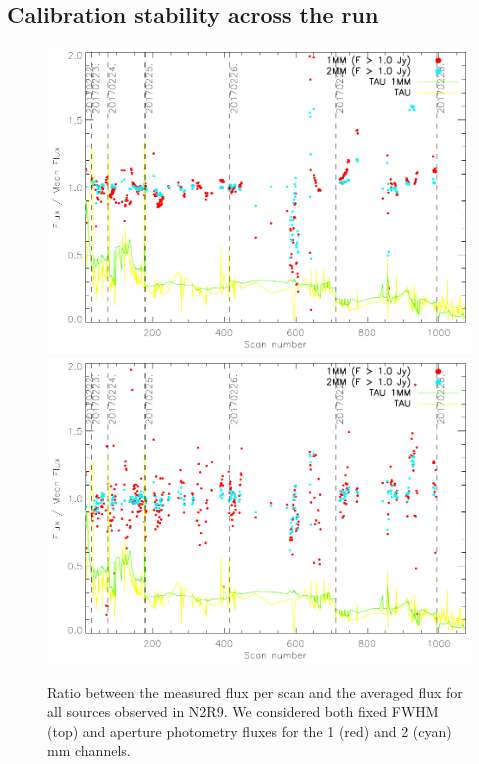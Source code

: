 \subsection{Calibration stability across the run}

\begin{figure}[ht]
\begin{center}
\includegraphics[clip, angle=0, scale = 0.7]{Figures/FluxIndScans/flux_ratio_run22.pdf}
\includegraphics[clip, angle=0, scale = 0.7]{Figures/FluxIndScans/flux_ap_ratio_run22.pdf}
\caption{Ratio between the measured flux per scan and the averaged flux for all sources observed in N2R9. We considered both fixed FWHM (top) and aperture photometry fluxes for the 1 (red) and 2 (cyan) mm channels. }
\label{fig:fluxvsscan}
\end{center}
\end{figure}

